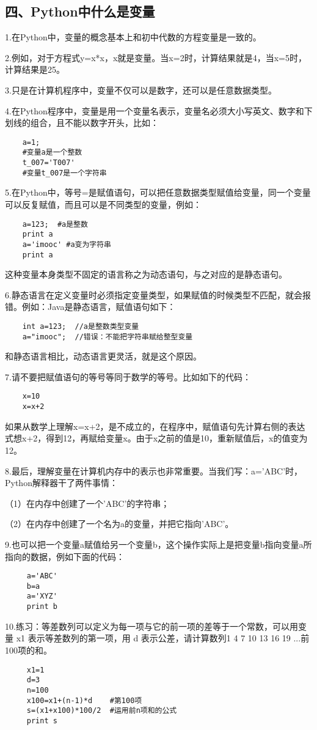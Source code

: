 \documentclass{article}
\begin{document}
\begin{CJK}{UTF8}{gbsn}
\part*{四、Python中什么是变量}
\subparagraph*{}
1.在Python中，变量的概念基本上和初中代数的方程变量是一致的。
\subparagraph*{}
2.例如，对于方程式y=x*x，x就是变量。当x=2时，计算结果就是4，当x=5时，计算结果是25。
\subparagraph*{}
3.只是在计算机程序中，变量不仅可以是数字，还可以是任意数据类型。
\subparagraph*{}
4.在Python程序中，变量是用一个变量名表示，变量名必须大小写英文、数字和下划线的组合，且不能以数字开头，比如：
\begin{verbatim}
    a=1;
    #变量a是一个整数
    t_007='T007'
    #变量t_007是一个字符串
\end{verbatim}
\subparagraph*{}
5.在Python中，等号=是赋值语句，可以把任意数据类型赋值给变量，同一个变量可以反复赋值，而且可以是不同类型的变量，例如：
\begin{verbatim}
    a=123;  #a是整数
    print a
    a='imooc' #a变为字符串
    print a
\end{verbatim}
\subparagraph*{}
这种变量本身类型不固定的语言称之为动态语句，与之对应的是静态语句。
\subparagraph*{}
6.静态语言在定义变量时必须指定变量类型，如果赋值的时候类型不匹配，就会报错。例如：Java是静态语言，赋值语句如下：
\begin{verbatim}
    int a=123;  //a是整数类型变量
    a="imooc";  //错误：不能把字符串赋给整型变量
\end{verbatim}
\subparagraph*{}
和静态语言相比，动态语言更灵活，就是这个原因。
\subparagraph*{}
7.请不要把赋值语句的等号等同于数学的等号。比如如下的代码：
\begin{verbatim}
    x=10
    x=x+2
\end{verbatim}
\subparagraph*{}
如果从数学上理解x=x+2，是不成立的，在程序中，赋值语句先计算右侧的表达式想x+2，得到12，再赋给变量x。由于x之前的值是10，重新赋值后，x的值变为12。
\subparagraph*{}
8.最后，理解变量在计算机内存中的表示也非常重要。当我们写：a='ABC'时，Python解释器干了两件事情：
\subparagraph*{}
（1）在内存中创建了一个'ABC'的字符串；
\subparagraph*{}
（2）在内存中创建了一个名为a的变量，并把它指向'ABC'。
\subparagraph*{}
9.也可以把一个变量a赋值给另一个变量b，这个操作实际上是把变量b指向变量a所指向的数据，例如下面的代码：
\begin{verbatim}
     a='ABC'
     b=a
     a='XYZ'
     print b   
\end{verbatim}
\subparagraph*{}
10.练习：等差数列可以定义为每一项与它的前一项的差等于一个常数，可以用变量 x1 表示等差数列的第一项，用 d 表示公差，请计算数列1 4 7 10 13 16 19 ...前100项的和。
\begin{verbatim}
     x1=1
     d=3
     n=100
     x100=x1+(n-1)*d    #第100项
     s=(x1+x100)*100/2  #运用前n项和的公式
     print s
\end{verbatim}

\end{CJK}
\end{document}
